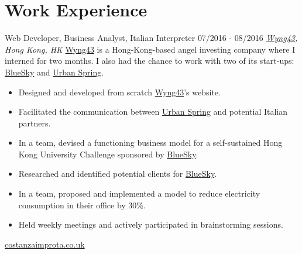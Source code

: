 \documentclass[]{friggeri-cv}
\begin{document}
\section{\color{red}Work \color{gray} Experience}
\begin{entrylist}
  \entry
    {}
    {Web Developer, Business Analyst, Italian Interpreter}
    {07/2016 - 08/2016}
    {\emph{\href{http://www.wyng43.com/}{Wyng43}, Hong Kong, HK}}
    {\href{http://www.wyng43.com/}{Wyng43} is a Hong-Kong-based angel investing company where I interned for two months. I also had the chance to work with two of its start-ups: \href{http://www.hibluesky.co/}{BlueSky} and \href{http://www.urbanspring.hk/}{Urban Spring}.}
    \begin{itemize}
        \item Designed and developed from scratch \href{http://www.wyng43.com/}{Wyng43}'s website.
        \item Facilitated the communication between \href{http://www.urbanspring.hk/}{Urban Spring} and potential Italian partners.
        \item In a team, devised a functioning business model for a self-sustained Hong Kong University Challenge sponsored by \href{http://www.hibluesky.co/}{BlueSky}.
        \item Researched and identified potential clients for \href{http://www.hibluesky.co/}{BlueSky}.
        \item In a team, proposed and implemented a model to reduce electricity consumption in their office by 30\%.
        \item Held weekly meetings and actively participated in brainstorming sessions.
    \end{itemize}
\end{entrylist}

\clearpage
\newpage

       {\href{http://www.costanzaimprota.co.uk/}{costanzaimprota.co.uk}}
\end{document}
